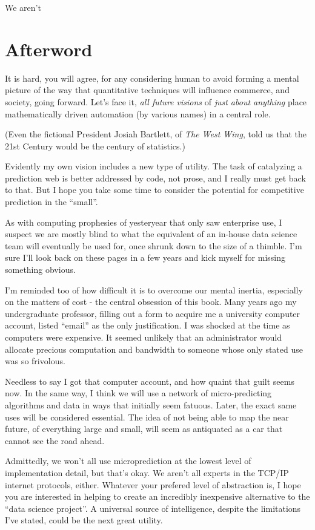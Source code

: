 We aren't
\chapter*{Afterword}
\label{chapter:afterword}


It is hard, you will agree, for any considering human to avoid forming a mental picture of the way that quantitative techniques will influence commerce, and society, going forward. Let's face it, {\em all future visions} of {\em just about anything} place mathematically driven automation (by various names) in a central role. 

(Even the fictional President Josiah Bartlett, of {\em The West Wing}, told us that the 21st Century would be the century of statistics.) 

Evidently my own vision includes a new type of utility. The task of catalyzing a prediction web is better addressed by code, not prose, and I really must get back to that. But I hope you take some time to consider the potential for competitive prediction in the ``small''. 

As with computing prophesies of yesteryear that only saw enterprise use, I suspect we are mostly blind to what the  equivalent of an in-house data science team will eventually be used for, once shrunk down to the size of a thimble. I'm sure I'll look back on these pages in a few years and kick myself for missing something obvious. 

I'm reminded too of how difficult it is to overcome our mental inertia, especially on the matters of cost - the central obsession of this book. Many years ago my undergraduate professor, filling out a form to acquire me a university computer account, listed ``email'' as the only justification. I was shocked at the time as computers were expensive. It seemed unlikely that an administrator would allocate precious computation and bandwidth to someone whose only stated use was so frivolous. 
 
Needless to say I got that computer account, and how quaint that guilt seems now. In the same way, I think we will use a network of micro-predicting algorithms and data in ways that initially seem fatuous. Later, the exact same uses will be considered essential. The idea of not being able to map the near future, of everything large and small, will seem as antiquated as a car that cannot see the road ahead. 

Admittedly, we won't all use microprediction at the lowest level of implementation detail, but that's okay. We aren't all experts in the TCP/IP internet protocols, either. Whatever your prefered level of abstraction is, I hope you are interested in helping to create an incredibly inexpensive alternative to the ``data science project''. A universal source of intelligence, despite the limitations I've stated, could be the next great utility. 

